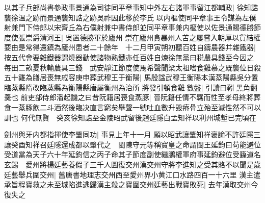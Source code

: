 以其子兵部尚書參政事景通為司徒同平章事知中外左右諸軍事留江都輔政|{
	徐知誥襲徐温之跡而景通襲知誥之跡吳祚因此移於李氏}
以内樞使同平章事王令謀為左僕射兼門下侍郎以宋齊丘為右僕射兼中書侍郎並同平章事兼内樞使以佐景通賜德勝節度使張崇爵清河王|{
	吳置德勝軍於廬州}
崇在廬州貪暴州人苦之屢嘗入朝厚以貨結權要由是常得還鎮為廬州患者二十餘年　十二月甲寅朔初聽百姓自鑄農器并雜鐵器|{
	按五代會要雜鐵器謂燒器動使諸物熟鐵亦任百姓自煉徐無黨曰税農具錢至今因之}
每田二畝夏秋輸農具三錢　武安靜江節度使馬希聲聞梁太祖嗜食雞慕之既襲位日殺五十雞為膳居喪無戚容庚申葬武穆王于衡陽|{
	馬殷諡武穆王衡陽本漢蒸陽縣吳分置臨蒸縣隋改臨蒸縣為衡陽縣唐屬衡州為治所}
將發引頓食雞數盤|{
	引讀曰靷黑角翻羮也}
前吏部侍郎潘起譏之曰昔阮籍居喪食蒸豚|{
	晉阮籍任情不羈而性至孝母終將葬食一蒸豚飲二斗酒然後臨决直言窮矣舉聲一號吐血數升毁瘠骨立殆至滅性然不可以訓也}
何代無賢　癸亥徐知誥至金陵昭武留後趙廷隱白孟知祥以利州城塹已完頃在

劍州與牙内都指揮使李肇同功|{
	事見上年十一月}
願以昭武讓肇知祥褒諭不許廷隱三讓癸酉知祥召廷隱還成都以肇代之　閩陳守元等稱寶皇之命謂閩王延鈞曰苟能避位受道當為天子六十年延鈞信之丙子命其子節度副使繼鵬權軍府事延鈞避位受籙道名玄錫　愛州將楊廷藝養假子三千人圖復交州漢交州守將李進知之受其賂不以聞是歲廷藝舉兵圍交州|{
	舊唐書地理志交州西至愛州界小黄江口水路四百一十六里}
漢主遣承旨程寶救之未至城陷進逃歸漢主殺之寶圍交州廷藝出戰寶敗死|{
	去年漢取交州今復失之}


